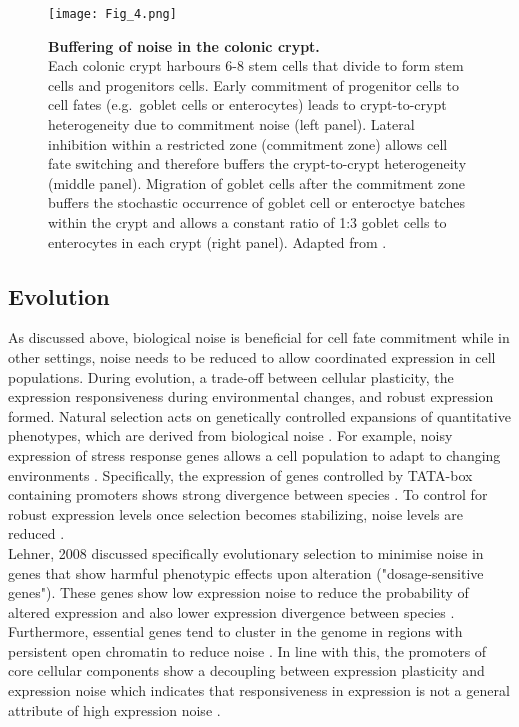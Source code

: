 \begin{figure}[!h]
\centering
\texttt{[image: Fig\_4.png]}
\caption[Buffering of noise in the colonic crypt]{\textbf{Buffering of noise in the colonic crypt.}\\
Each colonic crypt harbours 6-8 stem cells that divide to form stem cells and progenitors cells. Early commitment of progenitor cells to cell fates (e.g.~goblet cells or enterocytes) leads to crypt-to-crypt heterogeneity due to commitment noise (left panel). Lateral inhibition within a restricted zone (commitment zone) allows cell fate switching and therefore buffers the crypt-to-crypt heterogeneity (middle panel). Migration of goblet cells after the commitment zone buffers the stochastic occurrence of goblet cell or enteroctye batches within the crypt and allows a constant ratio of 1:3 goblet cells to enterocytes in each crypt (right panel). Adapted from \citep{Toth2017}.}
\label{fig0:noise_tissue}
\end{figure}

\subsection{Evolution}

As discussed above, biological noise is beneficial for cell fate commitment while in other settings, noise needs to be reduced to allow coordinated expression in cell populations. During evolution, a trade-off between cellular plasticity, the expression responsiveness during environmental changes, and robust expression formed. Natural selection acts on genetically controlled expansions of quantitative phenotypes, which are derived from biological noise \citep{Eldar2010}. For example, noisy expression of stress response genes allows a cell population to adapt to changing environments \citep{Lopez-Maury2009}. Specifically, the expression of genes controlled by TATA-box containing promoters shows strong divergence between species \citep{Tirosh2006}. To control for robust expression levels once selection becomes stabilizing, noise levels are reduced \citep{Lopez-Maury2009, Eldar2010, Pires2016}. \\

Lehner, 2008 discussed specifically evolutionary selection to minimise noise in genes that show harmful phenotypic effects upon alteration ("dosage-sensitive genes"). These genes show low expression noise to reduce the probability of altered expression and also lower expression divergence between species \citep{Lehner2008}. Furthermore, essential genes tend to cluster in the genome in regions with persistent open chromatin to reduce noise \citep{Batada2007}. In line with this, the promoters of core cellular components show a decoupling between expression plasticity and expression noise which indicates that responsiveness in expression is not a general attribute of high expression noise \citep{Lehner2010a}. \\


